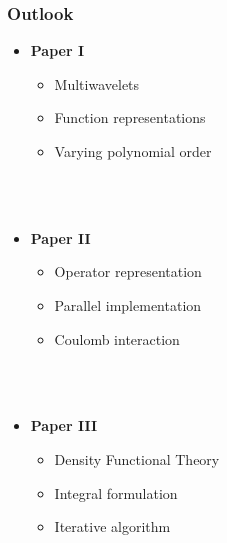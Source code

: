 \begin{frame}
    \frametitle{Outlook}
    \begin{itemize}
        \item   \textbf{Paper I}
        \begin{itemize}
            \item   Multiwavelets
            \item   Function representations
            \item   Varying polynomial order
        \end{itemize}
        \ \\
        \ \\
        \item   \textbf{Paper II}
        \begin{itemize}
            \item   Operator representation
            \item   Parallel implementation
            \item   Coulomb interaction
        \end{itemize}
        \ \\
        \ \\
        \item   \textbf{Paper III}
        \begin{itemize}
            \item   Density Functional Theory
            \item   Integral formulation
            \item   Iterative algorithm
        \end{itemize}
    \end{itemize}
\end{frame}
